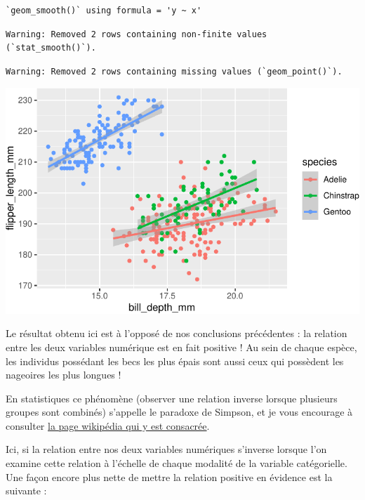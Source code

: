 \documentclass[
  a4paper,
  DIV=11,
  numbers=noendperiod,
  oneside]{scrreprt}
\begin{document}
\begin{verbatim}
`geom_smooth()` using formula = 'y ~ x'
\end{verbatim}

\begin{verbatim}
Warning: Removed 2 rows containing non-finite values (`stat_smooth()`).
\end{verbatim}

\begin{verbatim}
Warning: Removed 2 rows containing missing values (`geom_point()`).
\end{verbatim}

\includegraphics{03-visualization_files/figure-pdf/unnamed-chunk-83-1.pdf}

Le résultat obtenu ici est à l'opposé de nos conclusions précédentes :
la relation entre les deux variables numérique est en fait positive ! Au
sein de chaque espèce, les individus possédant les becs les plus épais
sont aussi ceux qui possèdent les nageoires les plus longues !

En statistiques ce phénomène (observer une relation inverse lorsque
plusieurs groupes sont combinés) s'appelle le paradoxe de Simpson, et je
vous encourage à consulter
\href{https://fr.wikipedia.org/wiki/Paradoxe_de_Simpson}{la page
wikipédia qui y est consacrée}.

Ici, si la relation entre nos deux variables numériques s'inverse
lorsque l'on examine cette relation à l'échelle de chaque modalité de la
variable catégorielle. Une façon encore plus nette de mettre la relation
positive en évidence est la suivante :
\end{document}
